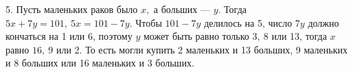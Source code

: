 5. Пусть маленьких раков было $x,$ а больших --- $y.$ Тогда  $5x+7y=101,\ 5x=101-7y.$ Чтобы $101-7y$ делилось на 5, число $7y$ должно кончаться на 1 или 6, поэтому $y$ может быть равно только $3,\ 8$ или 13, тогда $x$ равно $16,\ 9$ или 2. То есть могли купить 2 маленьких и 13 больших, 9 маленьких и 8 больших или 16 маленьких и 3 больших.\\
